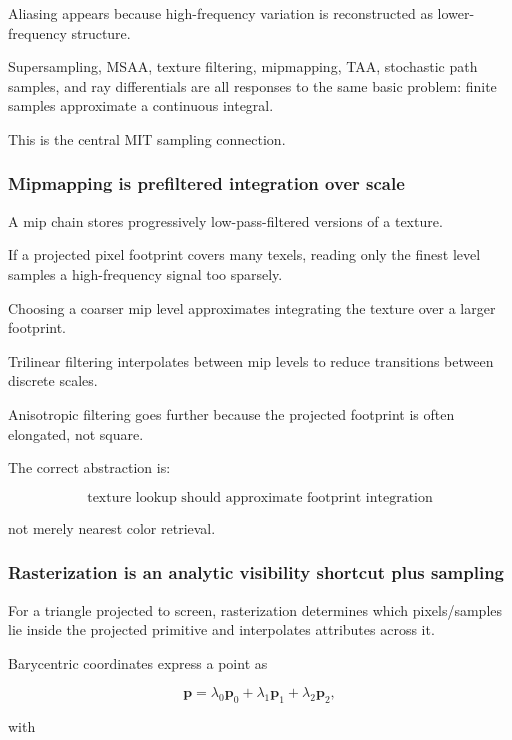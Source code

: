 Aliasing appears because high-frequency variation is reconstructed as lower-frequency structure.

Supersampling, MSAA, texture filtering, mipmapping, TAA, stochastic path samples, and ray differentials are all responses to the same basic problem: finite samples approximate a continuous integral.

This is the central MIT sampling connection.

\subsubsection{Mipmapping is prefiltered integration over scale}\label{03-visual-computing-i-ch001-mipmapping-is-prefiltered-integration-over-scale}

A mip chain stores progressively low-pass-filtered versions of a texture.

If a projected pixel footprint covers many texels, reading only the finest level samples a high-frequency signal too sparsely.

Choosing a coarser mip level approximates integrating the texture over a larger footprint.

Trilinear filtering interpolates between mip levels to reduce transitions between discrete scales.

Anisotropic filtering goes further because the projected footprint is often elongated, not square.

The correct abstraction is:

\[
\boxed{
\text{texture lookup should approximate footprint integration}
}
\]

not merely nearest color retrieval.

\subsubsection{Rasterization is an analytic visibility shortcut plus sampling}\label{03-visual-computing-i-ch001-rasterization-is-an-analytic-visibility-shortcut-plus-sampling}

For a triangle projected to screen, rasterization determines which pixels/samples lie inside the projected primitive and interpolates attributes across it.

Barycentric coordinates express a point as

\[
\mathbf p
=
\lambda_0\mathbf p_0
+
\lambda_1\mathbf p_1
+
\lambda_2\mathbf p_2,
\]

with

